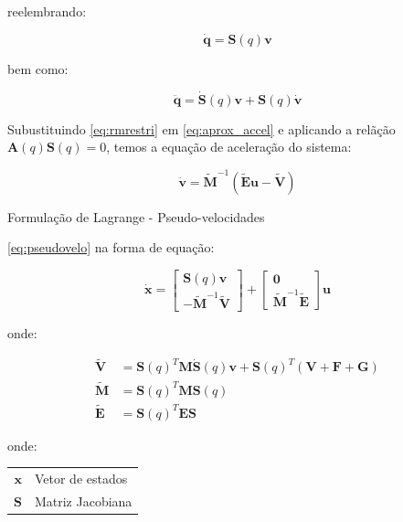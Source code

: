 reelembrando:

\begin{equation*}
    \mathbf{\dot{q}} = \mathbf{S}(q)\mathbf{v}
\end{equation*}

bem como:

\begin{equation}\label{eq:aprox_accel}
    \mathbf{\ddot{q}} = \mathbf{\dot{S}}(q)\mathbf{v} + \mathbf{S}(q)\mathbf{\dot{v}}
\end{equation}

Subustituindo \eqref{eq:rmrestri} em \eqref{eq:aprox_accel} e aplicando a relãção $\mathbf{A}(q)\mathbf{S}(q)=0$, temos a equação de aceleração do sistema:

\begin{equation}\label{eq:pseudovelo}
    \mathbf{\dot{v}} = \mathbf{\tilde{M}}^{-1}\left(\mathbf{\tilde{E}u - \tilde{V}} \right)
\end{equation}


Formulação de Lagrange - Pseudo-velocidades

\eqref{eq:pseudovelo} na forma de equação:

\begin{equation*}
    \mathbf{\dot{x}} =
    \begin{bmatrix}
        \mathbf{S}(q)\mathbf{v} \\
        \mathbf{-\tilde{M}}^{-1}\mathbf{\tilde{V}}
    \end{bmatrix}
    +
    \begin{bmatrix}
        \mathbf{0} \\
        \mathbf{\tilde{M}}^{-1}\mathbf{\tilde{E}}
    \end{bmatrix} \mathbf{u}
\end{equation*}

onde:

\begin{equation*}
    \begin{split}
        \mathbf{\tilde{V}} & =
        \mathbf{S}(q)^T\mathbf{M}\mathbf{\dot{S}}(q)\mathbf{v} + \mathbf{S}(q)^T (\mathbf{V + F + G})\\
        \mathbf{\tilde{M}} & = \mathbf{S}(q)^T\mathbf{M}\mathbf{S}(q)\\
        \mathbf{\tilde{E}} & = \mathbf{S}(q)^T\mathbf{E}\mathbf{S}
    \end{split}
\end{equation*}

onde:
\begin{tabular}{ r | l }
    $\mathbf{x}$ & Vetor de estados \\
    $\mathbf{S}$ & Matriz Jacobiana \\
\end{tabular}







